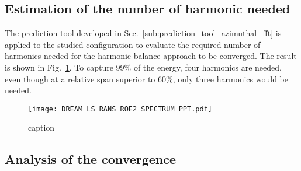 
\subsection{Estimation of the number of harmonic needed} 
\label{sub:estimation_of_the_number_of_harmonic_needed}

The prediction tool developed in 
Sec.~\ref{sub:prediction_tool_azimuthal_fft} is applied
to the studied configuration to evaluate the
required number of harmonics needed for the
harmonic balance approach to be converged.
The result is shown in Fig.~\ref{fig:DREAM_LS_RANS_ROE2_SPECTRUM_PPT}.
To capture 99\% of the energy, four harmonics are needed, even though
at a relative span superior to 60\%, only three harmonics would be needed.
\begin{figure}[htbp]
  \centering
  \texttt{[image: DREAM\_LS\_RANS\_ROE2\_SPECTRUM\_PPT.pdf]}
  \caption{caption}
  \label{fig:DREAM_LS_RANS_ROE2_SPECTRUM_PPT}
\end{figure}

\subsection{Analysis of the convergence} 
\label{sub:dream_ls_hb_convergence}


